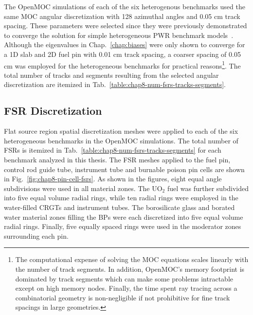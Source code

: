 The OpenMOC simulations of each of the six heterogenous benchmarks used the same \ac{MOC} angular discretization with 128 azimuthal angles and 0.05 cm track spacing. These parameters were selected since they were previously demonstrated to converge the solution for simple heterogeneous \ac{PWR} benchmark models~\cite{boyd2014ms}. Although the eigenvalues in Chap.~\ref{chap:biases} were only shown to converge for a 1D slab and 2D fuel pin with 0.01 cm track spacing, a coarser spacing of 0.05 cm was employed for the heterogeneous benchmarks for practical reasons\footnote{The computational expense of solving the \ac{MOC} equations scales linearly with the number of track segments. In addition, OpenMOC's memory footprint is dominated by track segments which can make some problems intractable except on high memory nodes. Finally, the time spent ray tracing across a combinatorial geometry is non-negligible if not prohibitive for fine track spacings in large geometries.}. The total number of tracks and segments resulting from the selected angular discretization are itemized in Tab.~\ref{table:chap8-num-fsrs-tracks-segments}. 

\subsection{\ac{FSR} Discretization}
\label{subsec:chap8-fsr-discretizations}

Flat source region spatial discretization meshes were applied to each of the six heterogeneous benchmarks in the OpenMOC simulations. The total number of \ac{FSR}s is itemized in Tab.~\ref{table:chap8-num-fsrs-tracks-segments} for each benchmark analyzed in this thesis. The \ac{FSR} meshes applied to the fuel pin, control rod guide tube, instrument tube and burnable poison pin cells are shown in Fig.~\ref{fig:chap8-pin-cell-fsrs}. As shown in the figures, eight equal angle subdivisions were used in all material zones. The UO$_2$ fuel was further subdivided into five equal volume radial rings, while ten radial rings were employed in the water-filled \acp{CRGT} and instrument tubes. The borosilicate glass and borated water material zones filling the \acp{BP} were each discretized into five equal volume radial rings. Finally, five equally spaced rings were used in the moderator zones surrounding each pin.

